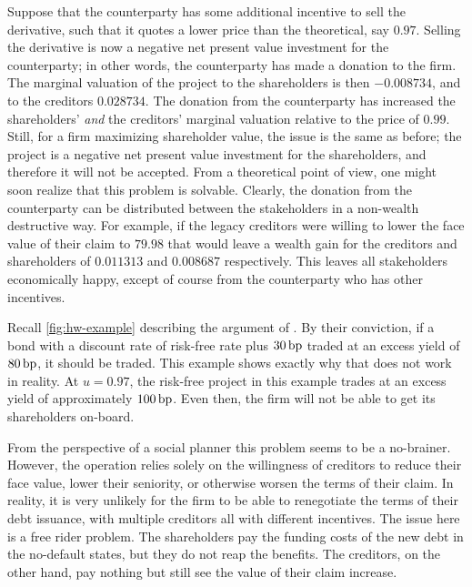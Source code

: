 \documentclass[main.tex]{subfiles}
\begin{document}
        Suppose that the counterparty has some additional incentive to sell the derivative,
        such that it quotes a lower price than the theoretical, say $\num{0.97}$.
        Selling the derivative is now a negative net present value investment for the counterparty;
        in other words, the counterparty has made a donation to the firm. 
        The marginal valuation of the project to the shareholders is then $\num{-0.008734}$,
        and to the creditors $\num{0.028734}$.
        The donation from the counterparty has increased the shareholders' 
        \textit{and} the creditors' marginal valuation relative to the price of $\num{0.99}$.
        Still, for a firm maximizing shareholder value, the issue is the same as before;
        the project is a negative net present value investment for the shareholders,
        and therefore it will not be accepted.
        From a theoretical point of view, one might soon realize that this problem is solvable.
        Clearly, the donation from the counterparty can be distributed between the 
        stakeholders in a non-wealth destructive way. 
        For example, if the legacy creditors were willing to lower the face value of their claim
        to $\num{79.98}$ that would leave a wealth gain for the creditors and shareholders
        of $\num{0.011313}$ and $\num{0.008687}$ respectively.
        This leaves all stakeholders economically happy, 
        except of course from the counterparty who has other incentives.

        Recall \cref{fig:hw-example} describing the argument of \textcite{HullWhite2012FVA}.
        By their conviction, if a bond with a discount rate of risk-free rate plus $30\,\text{bp}$ 
        traded at an excess yield of $80\,\text{bp}$, it should be traded. 
        This example shows exactly why that does not work in reality.
        At $u=\num{0.97}$, the risk-free project in this example trades at 
        an excess yield of approximately $100\,\text{bp}$.
        Even then, the firm will not be able to get its shareholders on-board.

        From the perspective of a social planner this problem seems to be a no-brainer. 
        However, the operation relies solely on the willingness of creditors to 
        reduce their face value, lower their seniority, or otherwise worsen the terms of their claim.
        In reality, it is very unlikely for the firm to be able to renegotiate 
        the terms of their debt issuance, with multiple creditors all with different incentives.
        The issue here is a free rider problem. 
        The shareholders pay the funding costs of the new debt in the no-default states,
        but they do not reap the benefits.
        The creditors, on the other hand, pay nothing 
        but still see the value of their claim increase.
\end{document}
